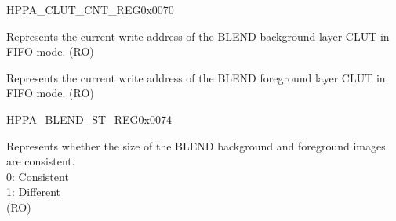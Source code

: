 \begin{register}{H}{PPA\_CLUT\_CNT\_REG}{0x0070}\label{regdesc:PPACLUTCNTREG}
%
%
%
\regnewline%
\begin{regdesc}\begin{reglist}
\label{fielddesc:PPABLEND0CLUTCNT}\item [PPA\_BLEND0\_CLUT\_CNT] Represents the current write address of the BLEND background layer CLUT in FIFO mode. (RO)
\label{fielddesc:PPABLEND1CLUTCNT}\item [PPA\_BLEND1\_CLUT\_CNT] Represents the current write address of the BLEND foreground layer CLUT in FIFO mode. (RO)
\end{reglist}\end{regdesc}
\end{register}


\begin{register}{H}{PPA\_BLEND\_ST\_REG}{0x0074}\label{regdesc:PPABLENDSTREG}
%
%
\regnewline%
\begin{regdesc}\begin{reglist}
\label{fielddesc:PPABLENDSIZEDIFFST}\item [PPA\_BLEND\_SIZE\_DIFF\_ST] Represents whether the size of the BLEND background and foreground images are consistent. \\
0: Consistent\\
1: Different\\
(RO)
\end{reglist}\end{regdesc}
\end{register}


